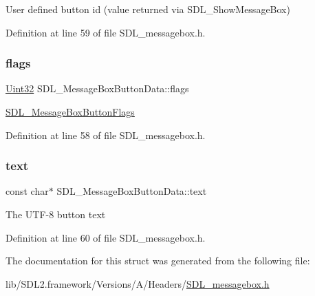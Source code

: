 User defined button id (value returned via S\+D\+L\+\_\+\+Show\+Message\+Box) 

Definition at line 59 of file S\+D\+L\+\_\+messagebox.\+h.

\mbox{\label{struct_s_d_l___message_box_button_data_a426c8b5da0e718242c7840706d95de0b}} 
\subsubsection{\texorpdfstring{flags}{flags}}
{\footnotesize\ttfamily \mbox{\hyperlink{_s_d_l__stdinc_8h_add440eff171ea5f55cb00c4a9ab8672d}{Uint32}} S\+D\+L\+\_\+\+Message\+Box\+Button\+Data\+::flags}

\mbox{\hyperlink{_s_d_l__messagebox_8h_ad21beffe204426be6efbf4990c916ad0}{S\+D\+L\+\_\+\+Message\+Box\+Button\+Flags}} 

Definition at line 58 of file S\+D\+L\+\_\+messagebox.\+h.

\mbox{\label{struct_s_d_l___message_box_button_data_af35f3062f0577159284c8828caaf08e4}} 
\subsubsection{\texorpdfstring{text}{text}}
{\footnotesize\ttfamily const char$\ast$ S\+D\+L\+\_\+\+Message\+Box\+Button\+Data\+::text}

The U\+T\+F-\/8 button text 

Definition at line 60 of file S\+D\+L\+\_\+messagebox.\+h.



The documentation for this struct was generated from the following file\+:\begin{DoxyCompactItemize}
\item 
lib/\+S\+D\+L2.\+framework/\+Versions/\+A/\+Headers/\mbox{\hyperlink{_s_d_l__messagebox_8h}{S\+D\+L\+\_\+messagebox.\+h}}\end{DoxyCompactItemize}
